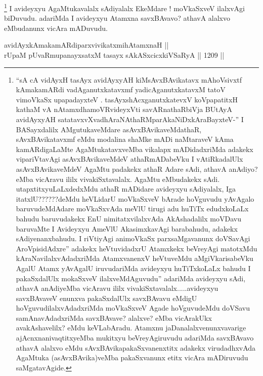 \begin{artha}
\footnote{``sA cA vidAyxH tasAyx avidAyxyAH kiMsAvxBAvikatavx mAhoVsivxtf kAmakamARdi vadAganutxkatavxmf yadicAganutxkatavxM tatoV vimoVkaSx upapadayxteV . tasAyxshAcx\s \s ganutxkatevxV koVpapatitxH kathaM vA nA\s \s tamxdhamoVR\s videyxVti savARnathaRbiVja BUtAyA avidAyxyAH satatavxvXvadhAraNAthaRMparAkaNiDxkA\s \s raBayxteV-'' I BASayxdalilx AMgutukaveMdare asAvxBAvikaveMdathaR, sAvxBAvikatavxmf eMdu modalina shaMke mADi naMtaraveV kAma kamARdigaLaMte AgaMtukatavxveMba vikalapx mADidadxriMda adakekx vipariVtavAgi asAvxBAvikaveMdeV athaRmADabeVku I vAtiRkadalUlx asAvxBAvikaveMdeV AgaMtu padakekx athaR Adare sAdi, athavA anAdiyo? eMba vicAravu ililx vivakiSxtavalalx. AgaMtu eMbudakekx sAdi. utapxtitxyuLaLxdedxMdu athaR mADidare avideyxyu sAdiyalalx, Iga itatxlU??????deMdu heVLidarU moVkaSxveV bArade hoVguvudu yAvAgalo baruvudeMdAdare moVkaSxvAda meVlU tirugi adu huTiTx edudxkoLaLx bahudu baruvudakekx EnU nimitatxvilalxvAda AkAshadalilx moVDavu baruvaMte I Avideyxyu AmeVlU AkasimxkavAgi barabahudu, adakekx sAdiyenanxbahudu. I riVtiyAgi animoVkaSx parxsaMgavanunx doVSavAgi AroVpisidAdxre'' adakekx heVtuvidadxrU Atamxkekx beVreyAgi matotxMdu kAraNavilalxvAdadxriMda AtamxvanenxV heVtuveMdu aMgiVkarisabeVku AgalU Atamx yAvAgalU iruvudariMda avideyxyu huTiTxkoLaLx bahudu I pakaSxdalUlx mokaSxveV ilalxveMdAguvudu'' adariMda avideyxyu sAdi, athavA anAdiyeMba vicAravu ililx vivakiSxtavalalx.....avideyxyu savxBAvaveV enunxva pakaSxdalUlx savxBAvavu eMdigU hoVguvudilalxvAdadxriMda moVkaSxveV Agade hoVguvudeMdu doVSavu samAnavAdadxriMda savxBAvave? alalxve? eMba vicArakUkx avakAshavelilx? eMdu keVLabAradu. Atamxnu jaDanalalxvenunxvavarige ajAcnxnanivaqtitxyeMba mukitxyu beVreyAgiruvudu adariMda savxBAvavo athavA alalxvo eMdu sAvxBAvikapakaSxvanenxtitx adakekx virudadhxvAda AgaMtuka (asAvxBAvika)veMba pakaSxvanunx etitx vicAra mADiruvudu saMgatavAgide.} 
I avideyxyu AgaMtukavalalx sAdiyalalx EkeMdare ! moVkaSxveV ilalxvAgi biDuvudu. adariMda I avideyxyu Atamxna savxBAvavo? athavA alalxvo eMbudanunx vicAra mADuvudu.
\end{artha}


\begin{shl}
\footnotemark[2]avidAyxkAmakamARdiparxvivikatxmihA\s \s tamxnaH || \\
rUpaM pUvaRmupanayxsatxM tasayx sAkASxcicxkiVSaRyA ||  1209 ||  
\end{shl}

